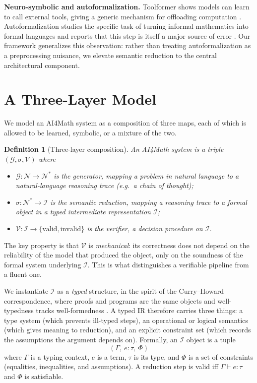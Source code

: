 \documentclass[11pt]{article}
\newtheorem{definition}{Definition}
\newcommand{\IR}{\mathcal{I}}
\newcommand{\NL}{\mathcal{N}}
\newcommand{\VV}{\mathcal{V}}
\newcommand{\GG}{\mathcal{G}}
\begin{document}
\textbf{Neuro-symbolic and autoformalization.} Toolformer shows models can learn to call external tools, giving a generic mechanism for offloading computation \cite{schick2023toolformer}. Autoformalization studies the specific task of turning informal mathematics into formal languages and reports that this step is itself a major source of error \cite{wu2022autoformal}. Our framework generalizes this observation: rather than treating autoformalization as a preprocessing nuisance, we elevate semantic reduction to the central architectural component.

\section{A Three-Layer Model}
We model an AI4Math system as a composition of three maps, each of which is allowed to be learned, symbolic, or a mixture of the two.

\begin{definition}[Three-layer composition]
An AI4Math system is a triple $(\GG, \sigma, \VV)$ where
\begin{itemize}
\item $\GG : \NL \to \NL^*$ is the \emph{generator}, mapping a problem in natural language to a natural-language reasoning trace (e.g.\ a chain of thought);
\item $\sigma : \NL^* \to \IR$ is the \emph{semantic reduction}, mapping a reasoning trace to a formal object in a typed intermediate representation $\IR$;
\item $\VV : \IR \to \{\text{valid}, \text{invalid}\}$ is the \emph{verifier}, a decision procedure on $\IR$.
\end{itemize}
\end{definition}

The key property is that $\VV$ is \emph{mechanical}: its correctness does not depend on the reliability of the model that produced the object, only on the soundness of the formal system underlying $\IR$. This is what distinguishes a verifiable pipeline from a fluent one.

We instantiate $\IR$ as a \emph{typed} structure, in the spirit of the Curry--Howard correspondence, where proofs and programs are the same objects and well-typedness tracks well-formedness \cite{howard1980}. A typed IR therefore carries three things: a type system (which prevents ill-typed steps), an operational or logical semantics (which gives meaning to reduction), and an explicit constraint set (which records the assumptions the argument depends on). Formally, an $\IR$ object is a tuple
\[
  (\Gamma,\ e:\tau,\ \Phi)
\]
where $\Gamma$ is a typing context, $e$ is a term, $\tau$ is its type, and $\Phi$ is a set of constraints (equalities, inequalities, and assumptions). A reduction step is valid iff $\Gamma \vdash e : \tau$ and $\Phi$ is satisfiable.
\end{document}
